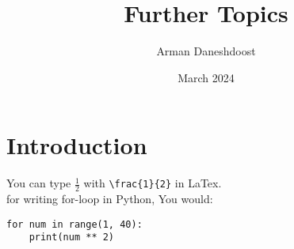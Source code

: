 \documentclass{article}
\title{Further Topics}
\author{Arman Daneshdoost}
\date{March 2024}
\begin{document}
	\maketitle
	
	\section{Introduction}
	You can type $\frac{1}{2}$ with  \verb+\frac{1}{2}+ in LaTex. %
	\\
	for writing for-loop in Python, You would:
\begin{Verbatim}[tabsize = 4]
for num in range(1, 40):
	print(num ** 2)
\end{Verbatim}

\end{document}
